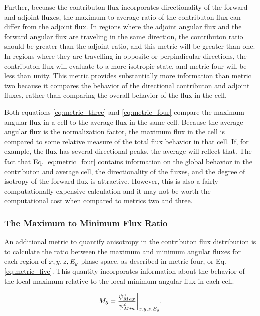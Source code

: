Further, becuase the
contributon flux incorporates directionality of the forward and adjoint fluxes,
the maximum to average ratio of the contributon flux can differ from the adjoint
flux. In regions where the adjoint
angular flux and the forward angular flux are traveling in the same direction,
the contributon ratio should be greater than the adjoint ratio, and this metric
will be greater than one. In regions where they are travelling in opposite or
perpindicular directions, the contributon flux will evaluate to a more isotropic
state, and metric four will be less than unity. This metric
provides substantially more information than metric two because
it compares the behavior of the directional contributon and adjoint fluxes,
rather than comparing the overall behavior of the flux in the cell.

Both equations \eqref{eq:metric_three} and \eqref{eq:metric_four} compare the maximum
angular flux in a cell to the average flux in the same cell. Because the average
angular flux is the normalization factor, the maximum flux in the cell is
compared to some relative measure of the total flux behavior in that cell. If,
for example, the flux has several directional peaks, the average will reflect
that.
The fact that Eq. \eqref{eq:metric_four} contains information on the global
behavior in the contributon and average cell, the directionality of the fluxes,
and the degree of isotropy of the forward flux is attractive. However,
this is also a fairly computationally expensive calculation and it may
not be worth the computational cost when compared to metrics two and three.

\subsubsection{The Maximum to Minimum Flux Ratio}

An additional metric to quantify anisotropy in the contributon flux distribution
is to calculate the ratio between the maximum and minimum angular fluxes for
each region of $x,y,z,E_g$ phase-space, as described in metric
four, or Eq. \eqref{eq:metric_five}. This
quantity incorporates information about the
behavior of the local maximum relative to the local
minimum angular flux in each cell.

\begin{equation}
  M_{5} = \frac{\psi^{c}_{Max}}{\psi^{c}_{
          Min}}\bigg\rvert_{x,y,z,E_g}  .
  \label{eq:metric_five}
\end{equation}

